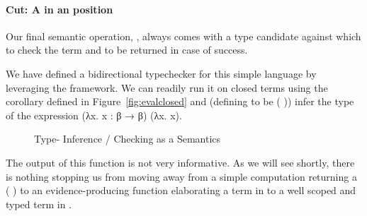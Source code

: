 \paragraph{Cut: A  in an  position} 
Our final semantic operation, , 
always comes with a type candidate against which to check the term and
to be returned in case of success.
\begin{agdasnippet}
\end{agdasnippet}
%
We have defined a bidirectional typechecker for this simple language by
leveraging the \semrec{} framework. We can readily run it on closed terms
using the  corollary defined in Figure~\ref{fig:evalclosed}
and (defining  to be {(  )}) infer the type of
the expression {(λx. x : β → β) (λx. x)}.

\begin{figure}[h!]
\begin{minipage}{0.35\textwidth}
\end{minipage}\hfill
\begin{minipage}{0.55\textwidth}
\end{minipage}
\caption{Type- Inference / Checking as a Semantics}
\end{figure}

The output of this function is not very informative. As we will see shortly,
there is nothing stopping us from moving away from a simple computation
returning a {( )} to an evidence-producing function
elaborating a term in  to a well scoped and typed term in .
